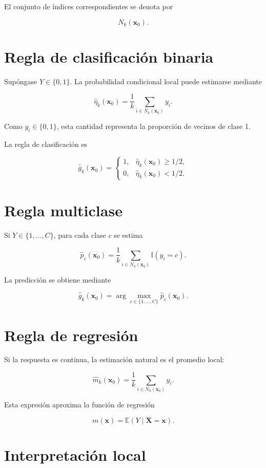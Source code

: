 \documentclass[
  spanish,
  11pt,
  letterpaper,
  DIV=11,
  numbers=noendperiod]{scrreprt}
\theoremstyle{definition}
\theoremstyle{plain}
\theoremstyle{definition}
\theoremstyle{remark}
\begin{document}
El conjunto de índices correspondientes se denota por

\[
N_k(\mathbf{x}_0).
\]

\section{Regla de clasificación
binaria}\label{regla-de-clasificaciuxf3n-binaria}

Supóngase \(Y\in\{0,1\}\). La probabilidad condicional local puede
estimarse mediante

\[
\widehat{\eta}_k(\mathbf{x}_0)
=
\frac{1}{k}
\sum_{i\in N_k(\mathbf{x}_0)} y_i.
\]

Como \(y_i\in\{0,1\}\), esta cantidad representa la proporción de
vecinos de clase 1.

La regla de clasificación es

\[
\widehat{g}_k(\mathbf{x}_0)
=
\begin{cases}
1, & \widehat{\eta}_k(\mathbf{x}_0)\ge 1/2,\\
0, & \widehat{\eta}_k(\mathbf{x}_0)<1/2.
\end{cases}
\]

\section{Regla multiclase}\label{regla-multiclase}

Si \(Y\in\{1,\ldots,C\}\), para cada clase \(c\) se estima

\[
\widehat{p}_c(\mathbf{x}_0)
=
\frac{1}{k}
\sum_{i\in N_k(\mathbf{x}_0)}
\mathbb{I}(y_i=c).
\]

La predicción se obtiene mediante

\[
\widehat{g}_k(\mathbf{x}_0)
=
\arg\max_{c\in\{1,\ldots,C\}}
\widehat{p}_c(\mathbf{x}_0).
\]

\section{Regla de regresión}\label{regla-de-regresiuxf3n}

Si la respuesta es continua, la estimación natural es el promedio local:

\[
\widehat{m}_k(\mathbf{x}_0)
=
\frac{1}{k}
\sum_{i\in N_k(\mathbf{x}_0)} y_i.
\]

Esta expresión aproxima la función de regresión

\[
m(\mathbf{x})=\mathbb{E}(Y\mid\mathbf{X}=\mathbf{x}).
\]

\section{Interpretación local}\label{interpretaciuxf3n-local}
\end{document}
